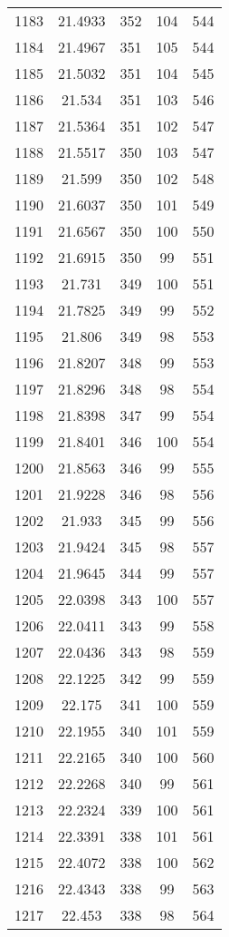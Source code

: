\documentclass[12pt,a4paper]{article}
\begin{document}
\begin{tabular}{r|cccc}
	1183 & 21.4933 & 352 & 104 & 544 \\
	1184 & 21.4967 & 351 & 105 & 544 \\
	1185 & 21.5032 & 351 & 104 & 545 \\
	1186 & 21.534 & 351 & 103 & 546 \\
	1187 & 21.5364 & 351 & 102 & 547 \\
	1188 & 21.5517 & 350 & 103 & 547 \\
	1189 & 21.599 & 350 & 102 & 548 \\
	1190 & 21.6037 & 350 & 101 & 549 \\
	1191 & 21.6567 & 350 & 100 & 550 \\
	1192 & 21.6915 & 350 & 99 & 551 \\
	1193 & 21.731 & 349 & 100 & 551 \\
	1194 & 21.7825 & 349 & 99 & 552 \\
	1195 & 21.806 & 349 & 98 & 553 \\
	1196 & 21.8207 & 348 & 99 & 553 \\
	1197 & 21.8296 & 348 & 98 & 554 \\
	1198 & 21.8398 & 347 & 99 & 554 \\
	1199 & 21.8401 & 346 & 100 & 554 \\
	1200 & 21.8563 & 346 & 99 & 555 \\
	1201 & 21.9228 & 346 & 98 & 556 \\
	1202 & 21.933 & 345 & 99 & 556 \\
	1203 & 21.9424 & 345 & 98 & 557 \\
	1204 & 21.9645 & 344 & 99 & 557 \\
	1205 & 22.0398 & 343 & 100 & 557 \\
	1206 & 22.0411 & 343 & 99 & 558 \\
	1207 & 22.0436 & 343 & 98 & 559 \\
	1208 & 22.1225 & 342 & 99 & 559 \\
	1209 & 22.175 & 341 & 100 & 559 \\
	1210 & 22.1955 & 340 & 101 & 559 \\
	1211 & 22.2165 & 340 & 100 & 560 \\
	1212 & 22.2268 & 340 & 99 & 561 \\
	1213 & 22.2324 & 339 & 100 & 561 \\
	1214 & 22.3391 & 338 & 101 & 561 \\
	1215 & 22.4072 & 338 & 100 & 562 \\
	1216 & 22.4343 & 338 & 99 & 563 \\
	1217 & 22.453 & 338 & 98 & 564 \\

\end{tabular}
\end{document}
